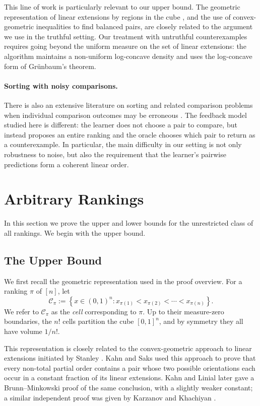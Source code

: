 \documentclass[11pt]{article}
\theoremstyle{definition}
\theoremstyle{remark}
\begin{document}
This line of work is particularly relevant to our upper bound. The
geometric representation of linear extensions by regions in the cube
\cite{Stanley1986}, and the use of convex-geometric inequalities to find
balanced pairs, are closely related to the argument we use in the truthful
setting. Our treatment with untruthful counterexamples requires going
beyond the uniform measure on the set of linear extensions: the algorithm
maintains a non-uniform log-concave density and uses the log-concave form
of Gr\"unbaum's theorem.

\paragraph{Sorting with noisy comparisons.}
There is also an extensive literature on sorting and related comparison
problems when individual comparison outcomes may be erroneous
\cite{RivestEtAl1980,FeigeEtAl1994,BravermanMossel2008}.
The feedback model studied here is different: the learner does not choose a
pair to compare, but instead proposes an entire ranking and the oracle
chooses which pair to return as a counterexample. In particular, the main
difficulty in our setting is not only robustness to noise, but also the
requirement that the learner's pairwise predictions form a coherent linear
order.

\section{Arbitrary Rankings}
\label{sec:arbitrary-rankings}

In this section we prove the upper and lower bounds for the unrestricted
class of all rankings. We begin with the upper bound.

\subsection{The Upper Bound}
\label{sec:arbitrary-upper}

We first recall the geometric representation used in the proof overview.
For a ranking $\pi$ of $[n]$, let
\[
    \mathcal C_\pi
    :=
    \left\{
        x\in(0,1)^n:
        x_{\pi(1)}<x_{\pi(2)}<\cdots<x_{\pi(n)}
    \right\}.
\]
We refer to $\mathcal C_\pi$ as the \emph{cell} corresponding to $\pi$.
Up to their measure-zero boundaries, the $n!$ cells partition the cube
$[0,1]^n$, and by symmetry they all have volume $1/n!$.

This representation is closely related to the convex-geometric approach to
linear extensions initiated by Stanley \cite{Stanley1981}. Kahn and Saks
\cite{KahnSaks1984} used this approach to prove that every non-total partial
order contains a pair whose two possible orientations each occur in a
constant fraction of its linear extensions. Kahn and Linial
\cite{KahnLinial1991} later gave a Brunn--Minkowski proof of the same
conclusion, with a slightly weaker constant; a similar independent proof was given by Karzanov and Khachiyan \cite{KarzanovKhachiyan1991}.
\end{document}
